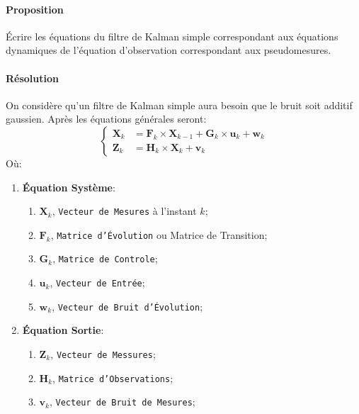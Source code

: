 \documentclass{article}
\begin{document}
\paragraph{Proposition}Écrire les équations du filtre de Kalman simple correspondant aux équations dynamiques de l'équation d'observation correspondant aux pseudomesures.

\paragraph{Résolution}On considère qu'un filtre de Kalman simple aura besoin que le bruit soit additif gaussien. Après les équations générales seront:
\begin{equation*}
    \begin{cases}
        \mathbf{X}_{k} &= \mathbf{F}_{k} \times \mathbf{X}_{k-1} + \mathbf{G}_{k} \times \mathbf{u}_{k} + \mathbf{w}_{k}\\
        \mathbf{Z}_{k} &= \mathbf{H}_{k} \times \mathbf{X}_{k} + \mathbf{v}_{k}
    \end{cases}
\end{equation*}
Où:
\begin{enumerate}
    \item \textbf{Équation Système}:
    \begin{enumerate}[noitemsep]
        \item $\mathbf{X}_{k}$, \texttt{Vecteur de Mesures} à l'instant $k$;
        \item $\mathbf{F}_{k}$, \texttt{Matrice d'Évolution} ou Matrice de Transition;
        \item $\mathbf{G}_{k}$, \texttt{Matrice de Controle};
        \item $\mathbf{u}_{k}$, \texttt{Vecteur de Entrée};
        \item $\mathbf{w}_{k}$, \texttt{Vecteur de Bruit d'Évolution};
    \end{enumerate}
    \item \textbf{Équation Sortie}:
    \begin{enumerate}[noitemsep]
        \item $\mathbf{Z}_{k}$, \texttt{Vecteur de Messures};
        \item $\mathbf{H}_{k}$, \texttt{Matrice d'Observations};
        \item $\mathbf{v}_{k}$, \texttt{Vecteur de Bruit de Mesures};
    \end{enumerate}
\end{enumerate}
\end{document}
